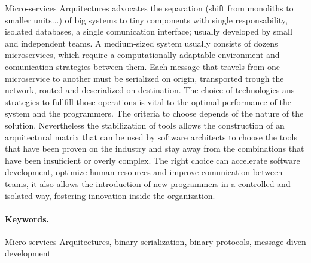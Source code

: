 
Micro-services Arquitectures advocates the separation (shift from monoliths to smaller units...) of big systems to tiny components with single responsability, isolated databases, a single comunication interface; usually developed by small and independent teams. A medium-sized system usually consists of dozens microservices, which require a computationally adaptable environment and comunication strategies between them.
Each message that travels from one microservice to another must be serialized on origin, transported trough the network, routed and deserialized on destination. The choice of technologies ans strategies to fullfill those operations is vital to the optimal performance of the system and the programmers. The criteria to choose depends of the nature of the solution. Nevertheless the stabilization of tools allows the construction of an arquitectural matrix that can be used by software architects to choose the tools that have been proven on the industry and stay away from the combinations that have been insuficient or overly complex.
The right choice can accelerate software development, optimize human resources and improve comunication between teams, it also allows the introduction of new programmers in a controlled and isolated way, fostering innovation inside the organization.

\paragraph{Keywords.}
Micro-services Arquitectures, binary serialization, binary protocols, message-diven development
